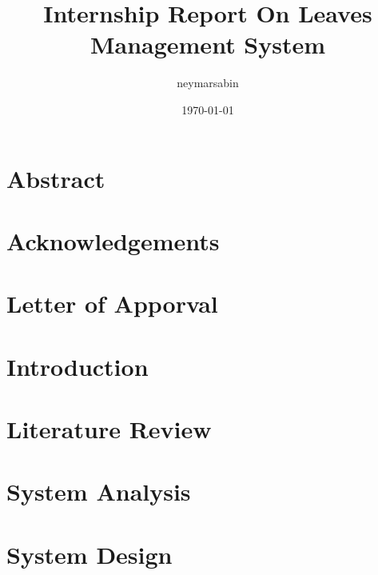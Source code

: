 \documentclass[a4paper,12pt,justified]{report}
\author{neymarsabin}
\date{\today}
\title{Internship Report On Leaves Management System}
\begin{document}
\chapter*{Abstract}
\chapter*{Acknowledgements}
\chapter*{Letter of Apporval}

\tableofcontents

\chapter{Introduction}


\chapter{Literature Review}


\chapter{System Analysis}


\chapter{System Design}

\end{document}

